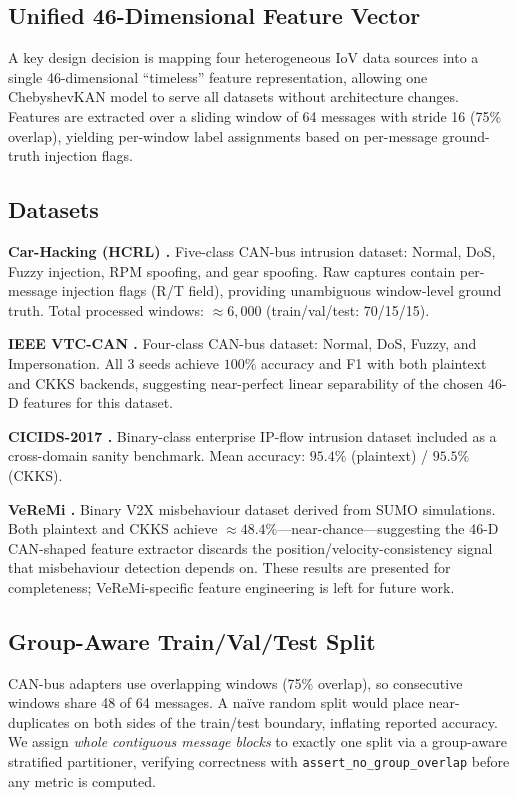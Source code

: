 \documentclass[conference]{IEEEtran}
\begin{document}
\subsection{Unified 46-Dimensional Feature Vector}

A key design decision is mapping four heterogeneous IoV data sources into
a single 46-dimensional ``timeless'' feature representation, allowing one
ChebyshevKAN model to serve all datasets without architecture changes.
Features are extracted over a sliding window of 64 messages with stride 16
(75\% overlap), yielding per-window label assignments based on per-message
ground-truth injection flags.

\subsection{Datasets}

\textbf{Car-Hacking (HCRL) \cite{lee2017car}.}
Five-class CAN-bus intrusion dataset: Normal, DoS, Fuzzy injection,
RPM spoofing, and gear spoofing. Raw captures contain per-message
injection flags (R/T field), providing unambiguous window-level ground
truth. Total processed windows: ${\approx}6{,}000$ (train/val/test: 70/15/15).

\textbf{IEEE VTC-CAN \cite{canvtc2020}.}
Four-class CAN-bus dataset: Normal, DoS, Fuzzy, and Impersonation. All
3 seeds achieve $100\%$ accuracy and F1 with both plaintext and CKKS
backends, suggesting near-perfect linear separability of the chosen
46-D features for this dataset.

\textbf{CICIDS-2017 \cite{cicids2017}.}
Binary-class enterprise IP-flow intrusion dataset included as a cross-domain
sanity benchmark. Mean accuracy: $95.4\%$ (plaintext) / $95.5\%$ (CKKS).

\textbf{VeReMi \cite{veremi2018}.}
Binary V2X misbehaviour dataset derived from SUMO simulations. Both plaintext
and CKKS achieve ${\approx}48.4\%$---near-chance---suggesting the 46-D
CAN-shaped feature extractor discards the position/velocity-consistency
signal that misbehaviour detection depends on. These results are presented
for completeness; VeReMi-specific feature engineering is left for future work.

\subsection{Group-Aware Train/Val/Test Split}

CAN-bus adapters use overlapping windows (75\% overlap), so consecutive
windows share 48 of 64 messages. A na\"ive random split would place
near-duplicates on both sides of the train/test boundary, inflating reported
accuracy. We assign \emph{whole contiguous message blocks} to exactly one
split via a group-aware stratified partitioner, verifying correctness with
\texttt{assert\_no\_group\_overlap} before any metric is computed.
\end{document}
